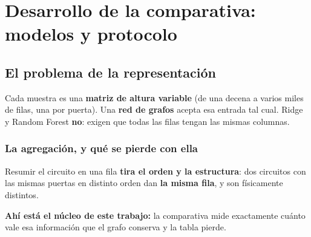 \chapter{Desarrollo de la comparativa: modelos y protocolo}
\label{cap:comparativa}

%

\section{El problema de la representación}
\label{sec:representacion_modelos}
Cada muestra es una \textbf{matriz de altura variable} (de una decena a varios miles de
filas, una por puerta). Una \textbf{red de grafos} acepta esa entrada tal cual. Ridge y
Random Forest \textbf{no}: exigen que todas las filas tengan las mismas columnas.

\subsection{La agregación, y qué se pierde con ella}
Resumir el circuito en una fila \textbf{tira el orden y la estructura}: dos circuitos con las
mismas puertas en distinto orden dan \textbf{la misma fila}, y son físicamente distintos.

\textbf{Ahí está el núcleo de este trabajo:} la comparativa mide exactamente cuánto vale esa
información que el grafo conserva y la tabla pierde.

